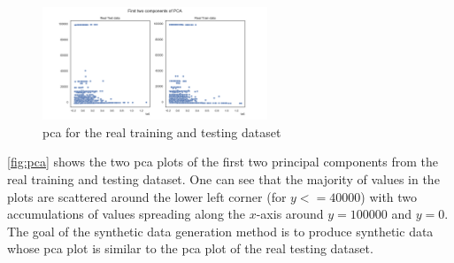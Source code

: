 \begin{figure}[h]
	\centering
	\includegraphics[width=0.6\textwidth]{images/pca/pca.png}
	\caption[PCA plot Real Data]{\gls{pca} for the real training and testing dataset}
	\label{fig:pca}
\end{figure}

\autoref{fig:pca} shows the two \gls{pca} plots of the first two principal components from the real training and testing dataset.
One can see that the majority of values in the plots are scattered around the lower left corner (for $y<=40000$) with two accumulations of values spreading along the $x$-axis around $y=100000$ and $y=0$.
The goal of the synthetic data generation method is to produce synthetic data whose \gls{pca} plot is similar to the \gls{pca} plot of the real testing dataset.

